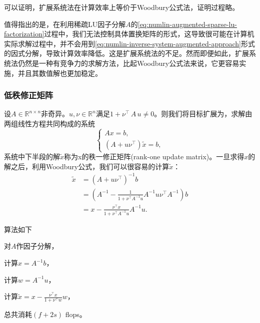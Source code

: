 \begin{subappendices}
可以证明，扩展系统法在计算效率上等价于Woodbury公式法，证明过程略。

值得指出的是，在利用稀疏LU因子分解$A$的\eqref{eq:numlin-augmented-sparse-lu-factorization}过程中，我们无法控制具体置换矩阵的形式，这导致很可能在计算机实际求解过程中，并不会用到\eqref{eq:numlin-inverse-system-augmented-approach}形式的因式分解，导致计算效率降低。这是扩展系统法的不足。然而即便如此，扩展系统法仍然是一种有竞争力的求解方法，比起Woodbury公式法来说，它更容易实施，并且其数值解也更加稳定。

\subsubsection{低秩修正矩阵}
\label{sec:numlin-lower-rank-update}
设$A \in \mathbb{R}^{n \times n}$非奇异。$u,\nu \in \mathbb{R}^{n}$满足$1 + \nu^{\top} \, A \, u \neq 0$。则我们将目标扩展为，求解由两组线性方程共同构成的系统
\begin{equation}
  \label{eq:numlin-lower-rank-update}
  \begin{cases}
    A x = b, \\
    \left( A + u \nu^{\top} \right) \tilde{x} = b,
  \end{cases}
\end{equation}
系统中下半段的解$\tilde{x}$称为x的秩一修正矩阵(rank-one update matrix)。一旦求得$x$的解之后，利用Woodbury公式，我们可以很容易的计算$\tilde{x}$：
\begin{equation*}
  \begin{split}
    \tilde{x} & = \left( A + u \nu^{\top} \right)^{-1} b \\
    & = \left(
    A^{-1} - \frac{1}{1 + \nu^{\top} A^{-1} u} A^{-1} u \nu^{\top} A^{-1}
    \right) b \\
    & = x - \frac{\nu^{\top} x }{1 + \nu^{\top} A^{-1} u} A^{-1} u.
  \end{split}
\end{equation*}

算法如下
\begin{algorithm}[秩一修正的计算]
  \label{algorithm:numlin-lower-rank-update}
\item 对$A$作因子分解，
\item 计算$x = A^{-1} b$，
\item 计算$w = A^{-1} u$，
\item 计算$\tilde{x} = x - \frac{\nu^{\top} x }{1 + \nu^{\top} w} w$，
\item 总共消耗$ \left( f + 2s \right)$ flops。
\end{algorithm}


\end{subappendices}
